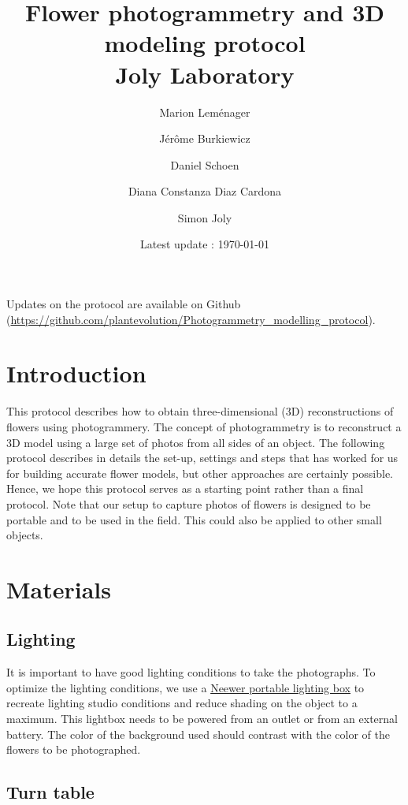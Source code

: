 \documentclass[10pt,letter,english]{article}
\title{Flower photogrammetry and 3D modeling protocol\\Joly Laboratory}
\date{Latest update : \today}
\author[1]{Marion Leménager}
\author[1]{Jérôme Burkiewicz}
\author[2]{Daniel Schoen}
\author[3]{Diana Constanza Diaz Cardona}
\author[1,3]{Simon Joly}
\affil[1]{Institut de recherche en biologie végétale, Département de Sciences Biologiques, Université de Montréal}
\affil[2]{Biology department, McGill University}
\affil[3]{Jardin Botanique de Montréal}
\begin{document}
\maketitle
\begin{center}
Updates on the protocol are available on Github (\url{https://github.com/plantevolution/Photogrammetry_modelling_protocol}).
\end{center}



\tableofcontents



\section{Introduction}

This protocol describes how to obtain three-dimensional (3D) reconstructions of flowers using photogrammery. The concept of photogrammetry is to reconstruct a 3D model using a large set of photos from all sides of an object. The following protocol describes in details the set-up, settings and steps that has worked for us for building accurate flower models, but other approaches are certainly possible. Hence, we hope this protocol serves as a starting point rather than a final protocol. Note that our setup to capture photos of flowers is designed to be portable and to be used in the field. This could also be applied to other small objects.

\section{Materials}

\subsection{Lighting}

It is important to have good lighting conditions to take the photographs.
To optimize the lighting conditions, we use a \href{https://neewer.com/collections/shooting-tent}{Neewer portable lighting box} to recreate lighting studio conditions and reduce shading on the object to a maximum. This lightbox needs to be powered from an outlet or from an external battery.
The color of the background used should contrast with the color of the flowers to be photographed.




\subsection{Turn table}
\end{document}
